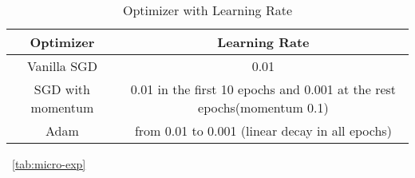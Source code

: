 \begin{table}[!htbp]
    \centering
    \begin{tabular}{|c|c|}
    \hline
    Optimizer & Learning Rate \\
    \hline
    Vanilla SGD &  0.01 \\
    SGD with momentum &  0.01 in the first 10 epochs and 0.001 at the rest epochs(momentum 0.1)\\
    Adam & from 0.01 to 0.001 (linear decay in all epochs) \\
    \hline 
    \end{tabular}
    \caption{Optimizer with Learning Rate}
    \label{tab:optlr}
\end{table}


~\ref{tab:micro-exp}

